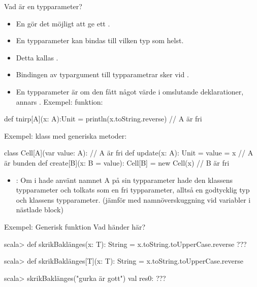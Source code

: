 \begin{Slide}{Vad är en typparameter?}\SlideFontSmall
  \setlength{\leftmargini}{0pt}

\begin{itemize}
\item En  gör det möjligt att ge ett .
\item En  typparameter kan bindas till vilken typ som helst.
\item Detta kallas  .
\item Bindingen av typargument till typparametrar sker vid .
\item En typparameter är  om den  fått något värde i omslutande deklarationer, annars . Exempel:  funktion:
\end{itemize}
\begin{Code}
def tnirp[A](x: A):Unit = println(x.toString.reverse) // A är fri
\end{Code}
\pause
Exempel:  klass med generiska metoder:
\begin{Code}
class Cell[A](var value: A):                          // A är fri
  def update(x: A): Unit = value = x                  // A är bunden
  def create[B](x: B = value): Cell[B] = new Cell(x)  // B är fri
\end{Code}
\pause
\begin{itemize}
\item {}: Om  i  hade använt namnet A på sin typparameter hade den  klassens typparameter och tolkats som en  fri typparameter, alltså en godtycklig typ och  klassens typparameter. (jämför med namnöverskuggning vid  variabler i nästlade block)
\end{itemize}

\end{Slide}

\ifkompendium\else
\begin{Slide}{Exempel: Generisk funktion}
Vad händer här?
\begin{REPL}

scala> def skrikBaklänges(x: T): String = x.toString.toUpperCase.reverse
???



scala> def skrikBaklänges[T](x: T): String = x.toString.toUpperCase.reverse

scala> skrikBaklänges("gurka är gott")
val res0: ???

\end{REPL}
\end{Slide}


